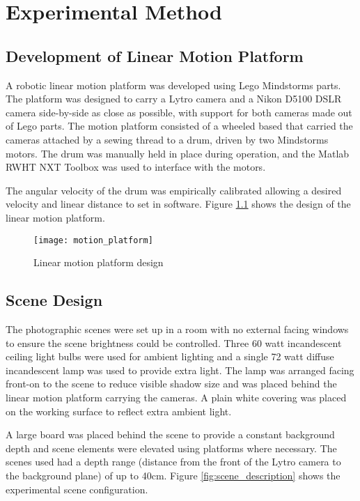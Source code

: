 
\chapter{Experimental Method}
\label{chap:experimental_method}


\section{Development of Linear Motion Platform}
\label{sec:development_of_linear_motion_platform}

A robotic linear motion platform was developed using Lego\textsuperscript{\textregistered} Mindstorms\textsuperscript{\textregistered} parts.
The platform was designed to carry a Lytro camera and a Nikon D5100 DSLR camera side-by-side as close as possible, with support for both cameras made out of Lego parts.
The motion platform consisted of a wheeled based that carried the cameras attached by a sewing thread to a drum, driven by two Mindstorms motors.
The drum was manually held in place during operation, and the Matlab RWHT NXT Toolbox \cite{rwth2007toolbox} was used to interface with the motors.

The angular velocity of the drum was empirically calibrated allowing a desired velocity and linear distance to set in software.
Figure \ref{fig:motion_platform} shows the design of the linear motion platform.

\begin{figure}[h]
\centering
\texttt{[image: motion\_platform]}
\caption[Linear motion platform design]{Linear motion platform design}
\label{fig:motion_platform}
\end{figure}


\section{Scene Design}
\label{sec:scene_design}

The photographic scenes were set up in a room with no external facing windows to ensure the scene brightness could be controlled.
Three 60 watt incandescent ceiling light bulbs were used for ambient lighting and a single 72 watt diffuse incandescent lamp was used to provide extra light.
The lamp was arranged facing front-on to the scene to reduce visible shadow size and was placed behind the linear motion platform carrying the cameras.
A plain white covering was placed on the working surface to reflect extra ambient light.

A large board was placed behind the scene to provide a constant background depth and scene elements were elevated using platforms where necessary.
The scenes used had a depth range (distance from the front of the Lytro camera to the background plane) of up to 40cm.
Figure \ref{fig:scene_description} shows the experimental scene configuration.

